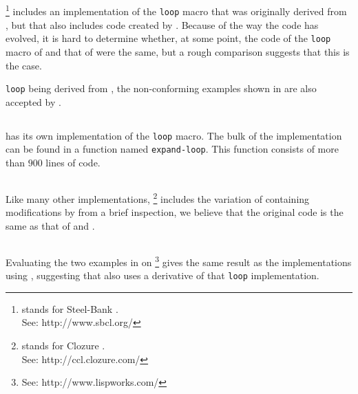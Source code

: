 \subsection{\sbcl{}}

\sbcl{}%
\footnote{\sbcl{} stands for Steel-Bank \commonlisp{}.\\ See:
  http://www.sbcl.org/} includes an implementation of the
\texttt{loop} macro that was originally derived from \mitloop{}, but
that also includes code created by \symbolics{}.  Because of the way
the code has evolved, it is hard to determine whether, at some point,
the code of the \texttt{loop} macro of \sbcl{} and that of \ecl{} were
the same, but a rough comparison suggests that this is the case.

\sbcl{} \texttt{loop} being derived from \mitloop{}, the
non-conforming examples shown in  are also accepted
by \sbcl{}.

\subsection{\clisp{}}

\clisp{} has its own implementation of the \texttt{loop} macro.  The
bulk of the implementation can be found in a function named
\texttt{expand-loop}.  This function consists of more than $900$ lines
of code.

\subsection{\ccl{}}

Like many other implementations, \ccl{}%
\footnote{\ccl{} stands for Clozure \commonlisp.\\ See:
  http://ccl.clozure.com/} includes the variation of \mitloop{}
containing modifications by \symbolics{} from a brief inspection, we
believe that the original code is the same as that of \sbcl{} and
\ecl{}.

\subsection{\lispworks}

Evaluating the two examples in  on \lispworks{}%
\footnote{See: http://www.lispworks.com/}
gives the same result as the implementations using \mitloop{},
suggesting that \lispworks{} also uses a derivative of that
\texttt{loop} implementation.
